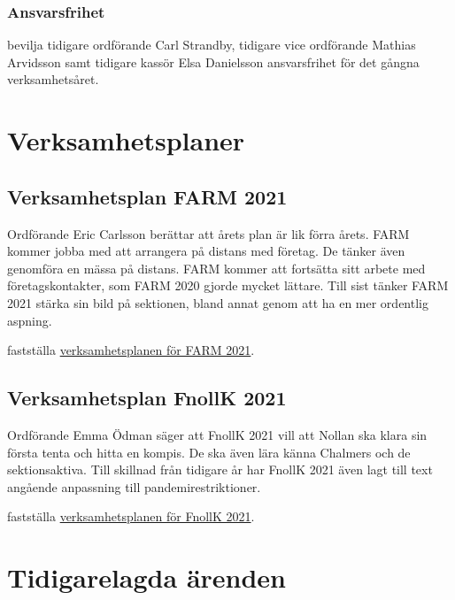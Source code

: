 \documentclass[hidelinks]{sektionsmote}
\begin{document}
\subsubsection{Ansvarsfrihet}
\begin{beslut}
  \item bevilja tidigare ordförande Carl Strandby, tidigare vice ordförande Mathias Arvidsson samt tidigare kassör Elsa Danielsson ansvarsfrihet för det gångna verksamhetsåret.
\end{beslut}


\section{Verksamhetsplaner}
\subsection{Verksamhetsplan FARM 2021}
Ordförande Eric Carlsson berättar att årets plan är lik förra årets.
FARM kommer jobba med att arrangera på distans med företag.
De tänker även genomföra en mässa på distans.
FARM kommer att fortsätta sitt arbete med företagskontakter, som FARM 2020 gjorde mycket lättare.
Till sist tänker FARM 2021 stärka sin bild på sektionen, bland annat genom att ha en mer ordentlig aspning.

\begin{beslut}
  \item fastställa \hyperlink{bilagor/farm/vp.pdf.1}{verksamhetsplanen för FARM 2021}.
\end{beslut}


\subsection{Verksamhetsplan FnollK 2021}
Ordförande Emma Ödman säger att FnollK 2021 vill att Nollan ska klara sin första tenta och hitta en kompis.
De ska även lära känna Chalmers och de sektionsaktiva.
Till skillnad från tidigare år har FnollK 2021 även lagt till text angående anpassning till pandemirestriktioner.

\begin{beslut}
  \item fastställa \hyperlink{bilagor/fnollk/vp.pdf.1}{verksamhetsplanen för FnollK 2021}.
\end{beslut}


\section{Tidigarelagda ärenden}
\end{document}

